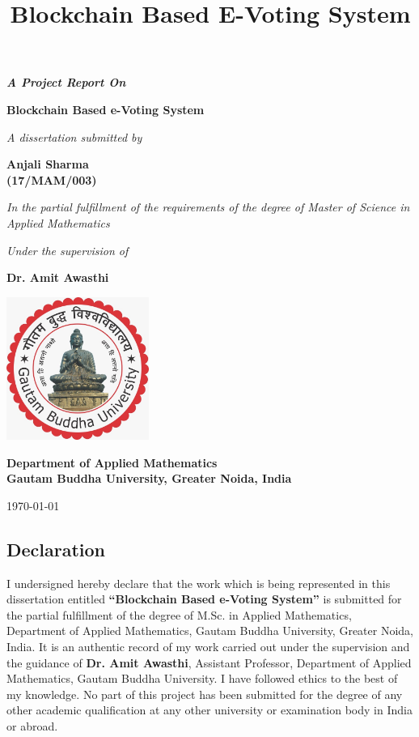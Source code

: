 \documentclass{report}
\title{Blockchain Based E-Voting System}
\begin{document}
\begin{center}

\textup{\large {\bf\emph{A Project Report On}}}

\vspace{0.3in}
\LARGE {\textbf {Blockchain Based e-Voting System}}


\vspace{0.5in}
\small \emph{\large{A dissertation submitted by}}

\vspace{0.1in}
{\large{\bf Anjali Sharma \\ (17/MAM/003)}}

\vspace{0.4in}
\emph{\large{In the partial fulfillment of the requirements of the degree of Master of Science in Applied Mathematics}}

\vspace{0.4in}
\emph{\large {Under the supervision of}}

\vspace{0.1in}
{\textbf{\large {Dr. Amit Awasthi}}}

\vspace{0.5in}
\includegraphics[width=0.35\textwidth]{48383172_349071859220901_5141705199164850176_n.jpg}

\vspace{0.3in}
\bf
\large {{Department of Applied Mathematics}\\ {Gautam Buddha University, Greater Noida, India}}

\vspace{0.1in}
\today
\end{center}
 \onehalfspacing


 \newpage
 \begin{center}
\section*{Declaration}
 \end{center}
 I undersigned hereby declare that the work which is being represented in this dissertation entitled \textbf{“Blockchain Based e-Voting System”} is submitted for the partial fulfillment of the degree of M.Sc. in Applied Mathematics, Department of Applied Mathematics, Gautam Buddha University, Greater Noida, India. It is an authentic record of my work carried out under the supervision and the guidance of \textbf{Dr. Amit Awasthi}, Assistant Professor, Department of Applied Mathematics, Gautam Buddha University.  I have followed ethics to the best of my knowledge. No part of this project has been submitted for the degree of any other academic qualification at any other university or examination body in India or abroad.
\end{document}
